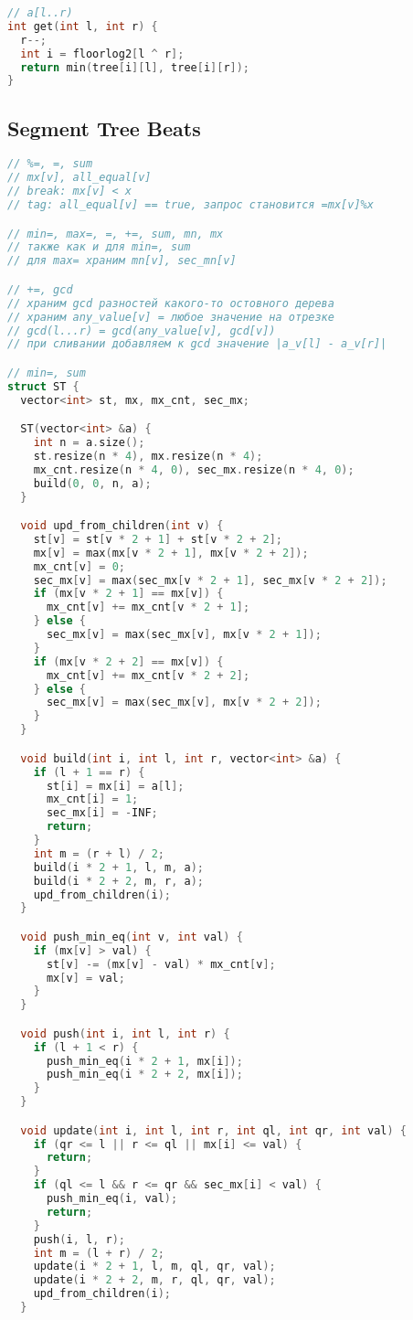 \documentclass[9pt,a4paper,landscape,twosided]{extarticle}
\begin{document}
\begin{multicols*}{3}
\begin{lstlisting}[language=C++]
// a[l..r)
int get(int l, int r) {
  r--;
  int i = floorlog2[l ^ r];
  return min(tree[i][l], tree[i][r]);
}

\end{lstlisting}

\subsection{Segment Tree Beats}
\begin{lstlisting}[language=C++]
// %=, =, sum
// mx[v], all_equal[v]
// break: mx[v] < x
// tag: all_equal[v] == true, запрос становится =mx[v]%x

// min=, max=, =, +=, sum, mn, mx
// также как и для min=, sum
// для max= храним mn[v], sec_mn[v]

// +=, gcd
// храним gcd разностей какого-то остовного дерева
// храним any_value[v] = любое значение на отрезке
// gcd(l...r) = gcd(any_value[v], gcd[v])
// при сливании добавляем к gcd значение |a_v[l] - a_v[r]|

// min=, sum
struct ST {
  vector<int> st, mx, mx_cnt, sec_mx;

  ST(vector<int> &a) {
    int n = a.size();
    st.resize(n * 4), mx.resize(n * 4);
    mx_cnt.resize(n * 4, 0), sec_mx.resize(n * 4, 0);
    build(0, 0, n, a);
  }

  void upd_from_children(int v) {
    st[v] = st[v * 2 + 1] + st[v * 2 + 2];
    mx[v] = max(mx[v * 2 + 1], mx[v * 2 + 2]);
    mx_cnt[v] = 0;
    sec_mx[v] = max(sec_mx[v * 2 + 1], sec_mx[v * 2 + 2]);
    if (mx[v * 2 + 1] == mx[v]) {
      mx_cnt[v] += mx_cnt[v * 2 + 1];
    } else {
      sec_mx[v] = max(sec_mx[v], mx[v * 2 + 1]);
    }
    if (mx[v * 2 + 2] == mx[v]) {
      mx_cnt[v] += mx_cnt[v * 2 + 2];
    } else {
      sec_mx[v] = max(sec_mx[v], mx[v * 2 + 2]);
    }
  }

  void build(int i, int l, int r, vector<int> &a) {
    if (l + 1 == r) {
      st[i] = mx[i] = a[l];
      mx_cnt[i] = 1;
      sec_mx[i] = -INF;
      return;
    }
    int m = (r + l) / 2;
    build(i * 2 + 1, l, m, a);
    build(i * 2 + 2, m, r, a);
    upd_from_children(i);
  }

  void push_min_eq(int v, int val) {
    if (mx[v] > val) {
      st[v] -= (mx[v] - val) * mx_cnt[v];
      mx[v] = val;
    }
  }

  void push(int i, int l, int r) {
    if (l + 1 < r) {
      push_min_eq(i * 2 + 1, mx[i]);
      push_min_eq(i * 2 + 2, mx[i]);
    }
  }

  void update(int i, int l, int r, int ql, int qr, int val) {
    if (qr <= l || r <= ql || mx[i] <= val) {
      return;
    }
    if (ql <= l && r <= qr && sec_mx[i] < val) {
      push_min_eq(i, val);
      return;
    }
    push(i, l, r);
    int m = (l + r) / 2;
    update(i * 2 + 1, l, m, ql, qr, val);
    update(i * 2 + 2, m, r, ql, qr, val);
    upd_from_children(i);
  }


\end{lstlisting}
\end{multicols*}
\end{document}
